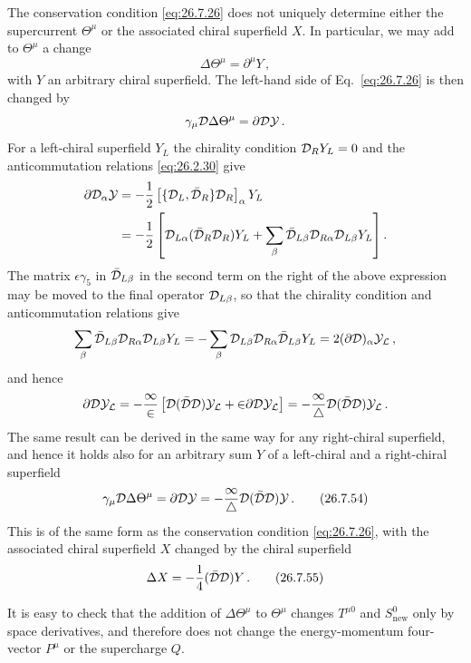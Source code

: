 The conservation condition \eqref{eq:26.7.26} does not uniquely determine
either the supercurrent \(\Theta^\mu\) or the associated chiral superfield
\(X\). In particular, we may add to \(\Theta^\mu\) a change
\begin{equation}
  \Delta\Theta^\mu=\partial^\mu Y\,,
  \tag{26.7.53}\label{eq:26.7.53}
\end{equation}
with \(Y\) an arbitrary chiral superfield. The left-hand side of
Eq.~\eqref{eq:26.7.26} is then changed by
\[
  \gamma_\mu\mathcal{D}\Delta\Theta^\mu
  =\sl{\partial}\mathcal{D} Y\,.
\]
For a left-chiral superfield \(Y_L\) the chirality condition
\(\mathcal{D}_RY_L=0\) and the anticommutation relations \eqref{eq:26.2.30} give
\[
  \begin{aligned}
  \sl{\partial}\mathcal{D}_\alpha Y
  &=-\frac12
    \left[\{\mathcal{D}_L,\bar{\mathcal{D}}_R\}\mathcal{D}_R\right]_\alpha Y_L
  \\
  &=-\frac12\left[
    \mathcal{D}_{L\alpha}(\bar{\mathcal{D}}_R\mathcal{D}_R)Y_L
    +\sum_\beta
      \bar{\mathcal{D}}_{L\beta}\mathcal{D}_{R\alpha}
      \mathcal{D}_{L\beta}Y_L
  \right].
  \end{aligned}
\]
The matrix \(\epsilon\gamma_5\) in \(\bar{\mathcal{D}}_{L\beta}\) in the second
term on the right of the above expression may be moved to the final operator
\(\mathcal{D}_{L\beta}\), so that the chirality condition and anticommutation
relations give
\[
  \sum_\beta
  \bar{\mathcal{D}}_{L\beta}\mathcal{D}_{R\alpha}\mathcal{D}_{L\beta}Y_L
  =-\sum_\beta
   \mathcal{D}_{L\beta}\mathcal{D}_{R\alpha}\bar{\mathcal{D}}_{L\beta}Y_L
  =2(\sl{\partial}\mathcal{D})_\alpha Y_L\,,
\]
and hence
\[
  \sl{\partial}\mathcal{D} Y_L
  =-\frac12\left[
    \mathcal{D}(\bar{\mathcal{D}}\mathcal{D})Y_L
    +2\sl{\partial}\mathcal{D} Y_L
  \right]
  =-\frac14\mathcal{D}(\bar{\mathcal{D}}\mathcal{D})Y_L\,.
\]
The same result can be derived in the same way for any right-chiral
superfield, and hence it holds also for an arbitrary sum \(Y\) of a
left-chiral and a right-chiral superfield
\begin{equation}
  \gamma_\mu\mathcal{D}\Delta\Theta^\mu
  =\sl{\partial}\mathcal{D} Y
  =-\frac14\mathcal{D}(\bar{\mathcal{D}}\mathcal{D})Y\,.
  \tag{26.7.54}\label{eq:26.7.54}
\end{equation}
This is of the same form as the conservation condition \eqref{eq:26.7.26},
with the associated chiral superfield \(X\) changed by the chiral superfield
\begin{equation}
  \Delta X=-\frac14(\bar{\mathcal{D}}\mathcal{D})Y\,.
  \tag{26.7.55}\label{eq:26.7.55}
\end{equation}

It is easy to check that the addition of \(\Delta\Theta^\mu\) to
\(\Theta^\mu\) changes \(T^{\mu0}\) and \(S_{\mathrm{new}}^0\) only by space
derivatives, and therefore does not change the energy-momentum four-vector
\(P^\mu\) or the supercharge \(Q\).

